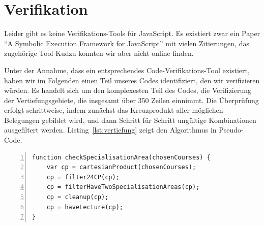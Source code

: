 \documentclass[ngerman]{article}
\begin{document}
\section{Verifikation}
Leider gibt es keine Verifikations-Tools für JavaScript.
Es existiert zwar ein Paper ``A Symbolic Execution Framework for JavaScript'' mit vielen Zitierungen, das zugehörige Tool Kudzu konnten wir aber nicht online finden.

Unter der Annahme, dass ein entsprechendes Code-Verifikations-Tool existiert, haben wir im Folgenden einen Teil unseres Codes identifiziert, den wir verifizieren würden.
Es handelt sich um den komplexesten Teil des Codes, die Verifizierung der Vertiefungsgebiete, die insgesamt über 350 Zeilen einnimmt.
Die Überprüfung erfolgt schrittweise, indem zunächst das Kreuzprodukt aller möglichen Belegungen gebildet wird, und dann Schritt für Schritt ungültige Kombinationen ausgefiltert werden.
Listing~\ref{lst:vertiefung} zeigt den Algorithmus in Pseudo-Code.

\begin{lstlisting}[caption=Pseudo-Code zur Prüfung von Vertiefungsgebieten,numbers=left,label={lst:vertiefung},frame=single]
function checkSpecialisationArea(chosenCourses) {
    var cp = cartesianProduct(chosenCourses);
    cp = filter24CP(cp);
    cp = filterHaveTwoSpecialisationAreas(cp);
    cp = cleanup(cp);
    cp = haveLecture(cp);
}
\end{lstlisting}
\end{document}
